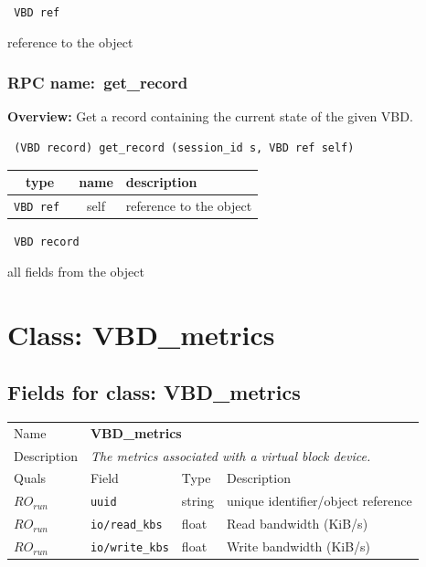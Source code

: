 {\tt 
VBD ref
}


reference to the object
\vspace{0.3cm}
\vspace{0.3cm}
\vspace{0.3cm}
\subsubsection{RPC name:~get\_record}

{\bf Overview:} 
Get a record containing the current state of the given VBD.

\begin{verbatim} (VBD record) get_record (session_id s, VBD ref self)\end{verbatim}



 
\vspace{0.3cm}
\begin{tabular}{|c|c|p{7cm}|}
 \hline
{\bf type} & {\bf name} & {\bf description} \\ \hline
{\tt VBD ref } & self & reference to the object \\ \hline 

\end{tabular}

\vspace{0.3cm}

{\tt 
VBD record
}


all fields from the object
\vspace{0.3cm}
\vspace{0.3cm}
\vspace{0.3cm}

\vspace{1cm}
\newpage
\section{Class: VBD\_metrics}
\subsection{Fields for class: VBD\_metrics}
\begin{longtable}{|lllp{}|}
\hline
\multicolumn{1}{|l}{Name} & \multicolumn{3}{l|}{\bf VBD\_metrics} \\
\multicolumn{1}{|l}{Description} & \multicolumn{3}{l|}{\parbox{11cm}{\em
The metrics associated with a virtual block device.}} \\
\hline
Quals & Field & Type & Description \\
\hline
$\mathit{RO}_\mathit{run}$ &  {\tt uuid} & string & unique identifier/object reference \\
$\mathit{RO}_\mathit{run}$ &  {\tt io/read\_kbs} & float & Read bandwidth (KiB/s) \\
$\mathit{RO}_\mathit{run}$ &  {\tt io/write\_kbs} & float & Write bandwidth (KiB/s) \\
\hline
\end{longtable}
